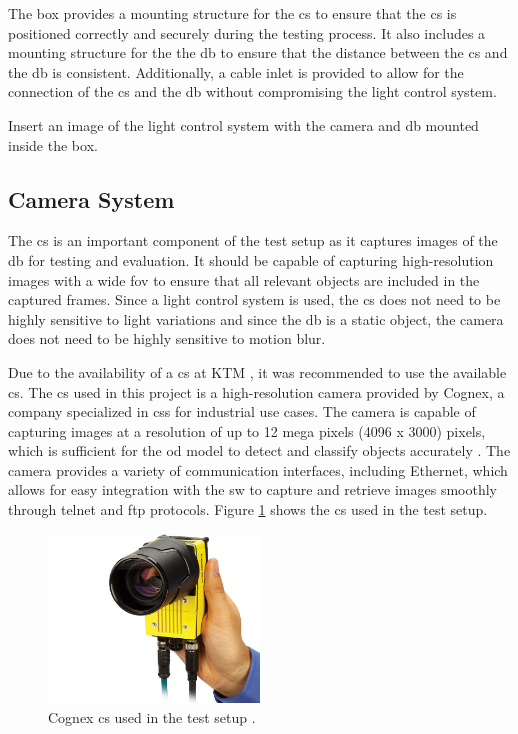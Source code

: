 The box provides a mounting structure for the \gls{cs} to ensure that the \gls{cs} is positioned correctly and securely during the testing process. It also includes a mounting structure for the the \gls{db} to ensure that the distance between the \gls{cs} and the \gls{db} is consistent. Additionally, a cable inlet is provided to allow for the connection of the \gls{cs} and the \gls{db} without compromising the light control system.

Insert an image of the light control system with the camera and \gls{db} mounted inside the box.

\subsection{Camera System}
The \gls{cs} is an important component of the test setup as it captures images of the \gls{db} for testing and evaluation. It should be capable of capturing high-resolution images with a wide \gls{fov} to ensure that all relevant objects are included in the captured frames. Since a light control system is used, the \gls{cs} does not need to be highly sensitive to light variations and since the \gls{db} is a static object, the camera does not need to be highly sensitive to motion blur.

Due to the availability of a \gls{cs} at KTM , it was recommended to use the available \gls{cs}. The \gls{cs} used in this project is a high-resolution camera provided by Cognex, a company specialized in \gls{cs}s for industrial use cases. The camera is capable of capturing images at a resolution of up to 12 mega pixels (4096 x 3000) pixels, which is sufficient for the \gls{od} model to detect and classify objects accurately \cite{Cognex_Camera}. The camera provides a variety of communication interfaces, including Ethernet, which allows for easy integration with the \gls{sw} to capture and retrieve images smoothly through \gls{telnet} and \gls{ftp} protocols. Figure \ref{Cognex_Camera} shows the \gls{cs} used in the test setup.

\begin{figure}[!htb]
    \centering
    \includegraphics[width=0.5\textwidth]{Figures/In-Sight 9000 in hand.jpg}
    \caption{Cognex \gls{cs} used in the test setup \cite{Cognex_Camera}.}
    \label{Cognex_Camera}
\end{figure}

